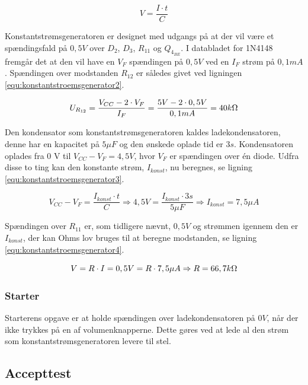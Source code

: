 \begin{equation}
\label{equ:konstantstroemsgenerator1}
V = \frac{I \cdot t}{C}
\end{equation}

Konstantstrømsgeneratoren er designet med udgangs på at der vil være et spændingsfald på $0,5 V$ over $D_2$, $D_3$, $R_{11}$ og $Q_{4_{BE}}$. I databladet for 1N4148 fremgår det at den vil have en $V_F$ spændingen på $0,5 V$ ved en $I_F$ strøm på $0,1 mA$. Spændingen over modstanden $R_{12}$ er således givet ved ligningen \ref{equ:konstantstroemsgenerator2}.

\begin{equation}
\label{equ:konstantstroemsgenerator2}
U_{R_{12}} = \frac{V_{CC} - 2 \cdot V_F}{I_F} = \frac{5V - 2 \cdot 0,5 V}{0,1 mA} = 40 k\ohm
\end{equation}

Den kondensator som konstantstrømsgeneratoren kaldes ladekondensatoren, denne har en kapacitet på $5 \mu F$ og den ønskede oplade tid er $3 s$. Kondensatoren oplades fra 0 V til $V_{CC} - V_F = 4,5 V$, hvor $V_F$ er spændingen over én diode. Udfra disse to ting kan den konstante strøm, $I_{konst}$, nu beregnes, se ligning \ref{equ:konstantstroemsgenerator3}.

\begin{equation}
\label{equ:konstantstroemsgenerator3}
V_{CC} - V_F = \frac{I_{konst} \cdot t}{C} \Rightarrow 4,5 V = \frac{I_{konst} \cdot 3 s}{5 \mu F} \Rightarrow I_{konst} = 7,5 \mu A
\end{equation}

Spændingen over $R_{11}$ er, som tidligere nævnt, $0,5 V$ og strømmen igennem den er $I_{konst}$, der kan Ohms lov bruges til at beregne modstanden, se ligning \ref{equ:konstantstroemsgenerator4}.

\begin{equation}
\label{equ:konstantstroemsgenerator4}
V = R \cdot I = 0,5 V = R \cdot 7,5 \mu A \Rightarrow R = 66,7 k\ohm
\end{equation}

\subsubsection{Starter}
\label{volumenkontrol-simulering-starter}

Starterens opgave er at holde spændingen over ladekondensatoren på $0 V$, når der ikke trykkes på en af volumenknapperne. Dette gøres ved at lede al den strøm som konstantstrømsgeneratoren levere til stel.

\subsection{Accepttest}
\label{volumenkontrol-accepttest}